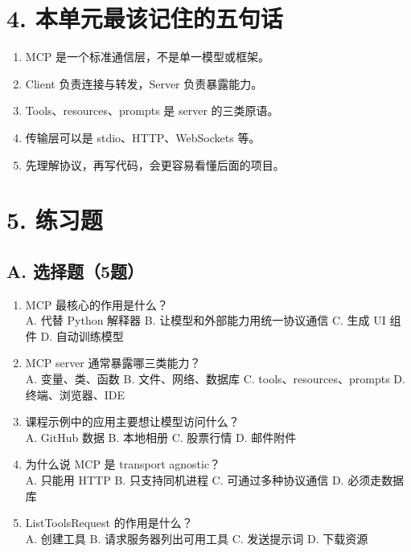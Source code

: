 \documentclass[UTF8,a4paper,11pt]{ctexart}
\begin{document}
\section*{4. 本单元最该记住的五句话}
\begin{enumerate}
  \item MCP 是一个标准通信层，不是单一模型或框架。
  \item Client 负责连接与转发，Server 负责暴露能力。
  \item Tools、resources、prompts 是 server 的三类原语。
  \item 传输层可以是 stdio、HTTP、WebSockets 等。
  \item 先理解协议，再写代码，会更容易看懂后面的项目。
\end{enumerate}

\section*{5. 练习题}
\subsection*{A. 选择题（5题）}
\begin{enumerate}
  \item MCP 最核心的作用是什么？\\
  A. 代替 Python 解释器 \quad B. 让模型和外部能力用统一协议通信 \quad C. 生成 UI 组件 \quad D. 自动训练模型

  \item MCP server 通常暴露哪三类能力？\\
  A. 变量、类、函数 \quad B. 文件、网络、数据库 \quad C. tools、resources、prompts \quad D. 终端、浏览器、IDE

  \item 课程示例中的应用主要想让模型访问什么？\\
  A. GitHub 数据 \quad B. 本地相册 \quad C. 股票行情 \quad D. 邮件附件

  \item 为什么说 MCP 是 transport agnostic？\\
  A. 只能用 HTTP \quad B. 只支持同机进程 \quad C. 可通过多种协议通信 \quad D. 必须走数据库

  \item ListToolsRequest 的作用是什么？\\
  A. 创建工具 \quad B. 请求服务器列出可用工具 \quad C. 发送提示词 \quad D. 下载资源

\end{enumerate}
\end{document}
